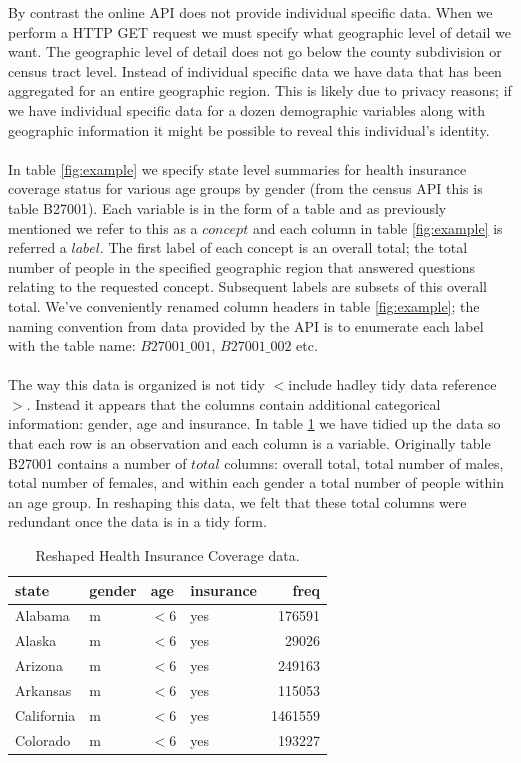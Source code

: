 \documentclass{article}\usepackage[]{graphicx}\usepackage[]{color}
\begin{document}
By contrast the online API does not provide individual specific data.  When we perform a HTTP GET request we must specify what geographic level of detail we want.  The geographic level of detail does not go below the county subdivision or census tract level.  Instead of individual specific data we have data that has been aggregated for an entire geographic region.  This is likely due to privacy reasons; if we have individual specific data for a dozen demographic variables along with geographic information it might be possible to reveal this individual's identity.  \\
\\
In table \ref{fig:example} we specify state level summaries for health insurance coverage status for various age groups by gender (from the census API this is table B27001).  Each variable is in the form of a table and as previously mentioned we refer to this as a $concept$ and each column in table \ref{fig:example} is referred a $label$.  The first label of each concept is an overall total; the total number of people in the specified geographic region that answered questions relating to the requested concept.   Subsequent labels are subsets of this overall total.  We've conveniently renamed column headers in table \ref{fig:example}; the naming convention from data provided by the API is to enumerate each label with the table name: $B27001\_001$, $B27001\_002$ etc.\\
\\
The way this data is organized is not tidy $<$include hadley tidy data reference$>$.  Instead it appears that the columns contain additional categorical information: gender, age and insurance.  In table \ref{fig:tidy} we have tidied up the data so that each row is an observation and each column is a variable.  Originally table B27001 contains a number of $total$ columns: overall total, total number of males, total number of females, and within each gender a total number of people within an age group.  In reshaping this data, we felt that these total columns were redundant once the data is in a tidy form. \\

\begin{table}[ht]
\centering
\begin{tabular}{llllr}
  \hline
state & gender & age & insurance & freq \\ 
  \hline
Alabama & m & $<$6 & yes & 176591 \\ 
  Alaska & m & $<$6 & yes & 29026 \\ 
  Arizona & m & $<$6 & yes & 249163 \\ 
  Arkansas & m & $<$6 & yes & 115053 \\ 
  California & m & $<$6 & yes & 1461559 \\ 
  Colorado & m & $<$6 & yes & 193227 \\ 
   \hline
\end{tabular}
\caption{Reshaped Health Insurance Coverage data.} 
\label{fig:tidy}
\end{table}
\end{document}

